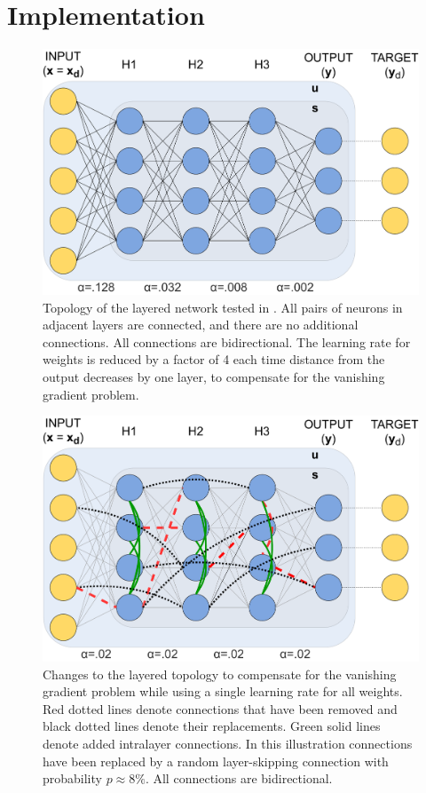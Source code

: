 \documentclass[format=sigconf]{acmart}
\begin{document}
\section{Implementation}

\begin{figure}
  \centering
    \includegraphics[width=\columnwidth]{figures/basic_topology_illustration.pdf}
    \caption{Topology of the layered network tested in \cite{scellier17}. All pairs of neurons in adjacent layers are connected, and there are no additional connections. All connections are bidirectional. The learning rate for weights is reduced by a factor of 4 each time distance from the output decreases by one layer, to compensate for the vanishing gradient problem.}
    \label{fig:top_basic}
\end{figure}
\hfill
\vspace{4mm}
\begin{figure}
	\centering
    \includegraphics[width=\columnwidth]{figures/topology_changes_illustration.pdf}
     \caption{Changes to the layered topology to compensate for the vanishing gradient problem while using a single learning rate for all weights. Red dotted lines denote connections that have been removed and black dotted lines denote their replacements. Green solid lines denote added intralayer connections. In this illustration connections have been replaced by a random layer-skipping connection with probability $p\approx 8\%$. All connections are bidirectional.}

    \label{fig:top_sw}
\end{figure}
\end{document}
